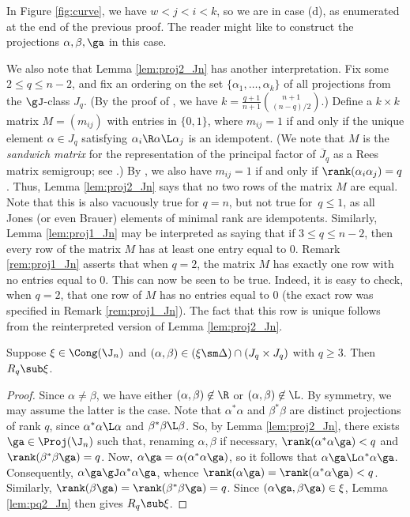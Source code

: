 %
\begin{rem}
In Figure \ref{fig:curve}, we have $w<j<i<k$, so we are in case (d), as enumerated at the end of the previous proof.  The reader might like to construct the projections $\alpha,\beta,\ga$ in this case.  
\end{rem}


\begin{rem}\label{rem:proj2_Jn}
We also note that Lemma \ref{lem:proj2_Jn} has another interpretation.
% 
Fix some $2\leq q\leq n-2$, and fix an ordering on the set $\{\alpha_1,\ldots,\alpha_k\}$ of all projections from the $\gJ$-class $J_q$.  (By the proof of \cite[Theorem~9.5]{EG2017}, we have $k=\frac{q+1}{n+1}\binom{n+1}{(n-q)/2}$.)  Define a $k\times k$ matrix $M=(m_{ij})$ with entries in $\{0,1\}$, where $m_{ij}=1$ if and only if 
the unique element $\alpha\in J_q$ satisfying $\alpha_i\R\alpha\L\alpha_j$ is an idempotent.
(We note that $M$ is the \emph{sandwich matrix} for the representation of the principal factor of $\overline{J}_q$ as a Rees matrix semigroup; see \cite[Section 3.2]{Howie}.)
By \cite[Lemma 2.3(ii)]{emojoka}, we also have $m_{ij}=1$ if and only if $\rank(\alpha_i\alpha_j)=q$.  Thus, Lemma \ref{lem:proj2_Jn} says that no two rows of the matrix $M$ are equal.  Note that this is also vacuously true for $q=n$, but not true for~$q\leq1$, as all Jones (or even Brauer) elements of minimal rank are idempotents.  Similarly, Lemma \ref{lem:proj1_Jn} may be interpreted as saying that if $3\leq q\leq n-2$, then every row of the matrix $M$ has at least one entry equal to $0$.  Remark \ref{rem:proj1_Jn} asserts that when $q=2$, the matrix $M$ has exactly one row with no entries equal to $0$.  This can now be seen to be true.  Indeed, it is easy to check, when $q=2$, that one row of $M$ has no entries equal to $0$ (the exact row was specified in Remark \ref{rem:proj1_Jn}).  The fact that this row is unique follows from the reinterpreted version of Lemma \ref{lem:proj2_Jn}.
\end{rem}




\begin{lemma}\label{lem:qq_Jn}
Suppose $\xi\in\Cong(\J_n)$ and $(\alpha,\beta)\in (\xi\sm\Delta)\cap (J_q\times J_q)$ with $q\geq3$.  Then $R_q\sub\xi$.
\end{lemma}


\begin{proof} Since $\alpha\not=\beta$, we have either $(\alpha,\beta)\not\in{\R}$ or $(\alpha,\beta)\not\in{\L}$.  By symmetry, we may assume the latter is the case.  Note that $\alpha^*\alpha$ and $\beta^*\beta$ are distinct projections of rank $q$, since $\alpha^*\alpha\L\alpha$ and $\beta^*\beta\L\beta$.  So, by Lemma \ref{lem:proj2_Jn}, there exists $\ga\in\Proj(\J_n)$ such that, renaming $\alpha,\beta$ if necessary, $\rank(\alpha^*\alpha\ga)<q$ and $\rank(\beta^*\beta\ga)=q$.  Now, $\alpha\ga=\alpha(\alpha^*\alpha\ga)$, so it follows that $\alpha\ga\L\alpha^*\alpha\ga$.  Consequently, $\alpha\ga\gJ\alpha^*\alpha\ga$, whence ${\rank(\alpha\ga)=\rank(\alpha^*\alpha\ga)<q}$.  Similarly, $\rank(\beta\ga)=\rank(\beta^*\beta\ga)=q$.  Since $(\alpha\ga,\beta\ga)\in\xi$, Lemma \ref{lem:pq2_Jn} then gives $R_q\sub\xi$. \end{proof}


